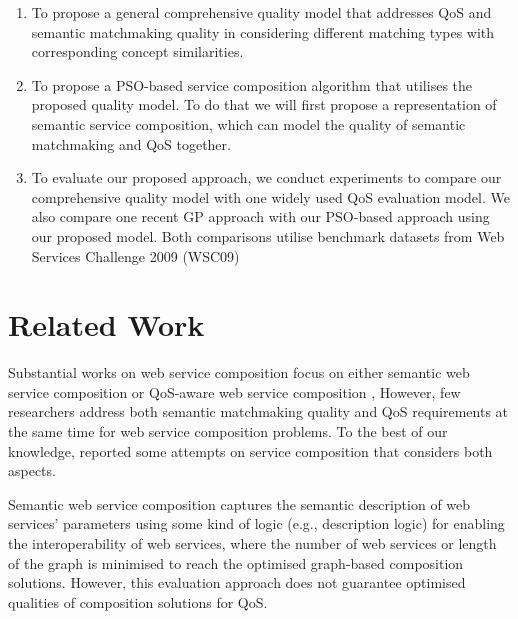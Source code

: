 \documentclass{llncs}
\begin{document}
\begin{enumerate}
 \item To propose a general comprehensive quality model that addresses QoS and semantic matchmaking quality in considering different matching types with corresponding concept similarities.
  
 \item To propose a PSO-based service composition algorithm that utilises the proposed quality model. To do that we will first propose a representation of semantic service composition, which can model the quality of semantic matchmaking and QoS together.
  
 \item To evaluate our proposed approach, we conduct experiments to compare our comprehensive quality model with one widely used QoS evaluation model. We also compare one recent GP approach \cite{ma2015hybrid} with our PSO-based approach using our proposed model. Both comparisons utilise benchmark datasets from Web Services Challenge 2009 (WSC09) \cite{kona2009wsc} 
  
\end{enumerate}

\section{Related Work} \label{relatedWork}
Substantial works on web service composition focus on either semantic web service composition \cite{boustil2014semantic,bansal2016generalized,mier2015integrated} or QoS-aware web service composition \cite{gupta2015optimization,qi2010combining,ma2015hybrid,da2016particle,da2015graphevol,yu2013adaptive}, However, few researchers address both semantic matchmaking quality and QoS requirements at the same time for web service composition problems. To the best of our knowledge, \cite{fanjiang2014semantic,lecue2009optimizing,pop2009immune} reported some attempts on service composition that considers both aspects.

Semantic web service composition \cite{boustil2014semantic,bansal2016generalized,mier2015integrated} captures the semantic description of web services' parameters using some kind of logic (e.g., description logic) for enabling the interoperability of web services, where the number of web services or length of the graph is minimised to reach the optimised graph-based composition solutions. However, this evaluation approach does not guarantee optimised qualities of composition solutions for QoS.
\end{document}

